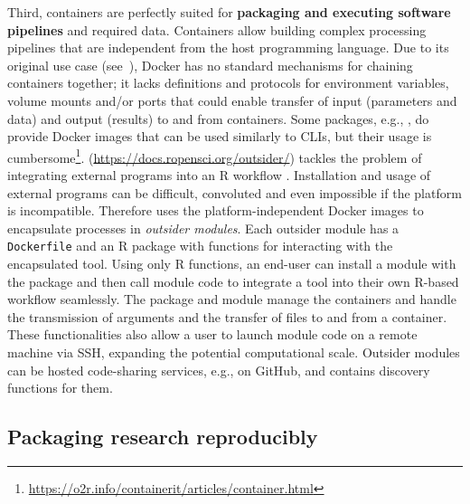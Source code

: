 \label{pipelines} Third, containers are perfectly suited for
\textbf{packaging and executing software pipelines} and required data.
Containers allow building complex processing pipelines that are
independent from the host programming language. Due to its original use
case (see~), Docker has no standard mechanisms for
chaining containers together; it lacks definitions and protocols for
environment variables, volume mounts and/or ports that could enable
transfer of input (parameters and data) and output (results) to and from
containers. Some packages, e.g., , do provide Docker
images that can be used similarly to CLIs, but their usage is
cumbersome\footnote{\href{https://o2r.info/containerit/articles/container.html}{https://o2r.info/containerit/articles/container.html}}.
\textbf{} (\url{https://docs.ropensci.org/outsider/})
tackles the problem of integrating external programs into an R workflow
\citep{bennett_outsider_2020}. Installation and usage of external
programs can be difficult, convoluted and even impossible if the
platform is incompatible. Therefore  uses the
platform-independent Docker images to encapsulate processes in
\emph{outsider modules}. Each outsider module has a \texttt{Dockerfile}
and an R package with functions for interacting with the encapsulated
tool. Using only R functions, an end-user can install a module with the
 package and then call module code to integrate a tool
into their own R-based workflow seamlessly. The  package
and module manage the containers and handle the transmission of
arguments and the transfer of files to and from a container. These
functionalities also allow a user to launch module code on a remote
machine via SSH, expanding the potential computational scale. Outsider
modules can be hosted code-sharing services, e.g., on GitHub, and
 contains discovery functions for them.

\hypertarget{packaging-research-reproducibly}{%
\subsection{Packaging research
reproducibly}\label{packaging-research-reproducibly}}

\label{compendia}

